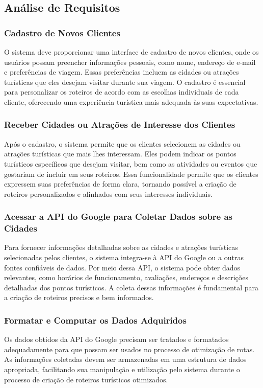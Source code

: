 \subsection{Análise de Requisitos}


\subsubsection{Cadastro de Novos Clientes}
O sistema deve proporcionar uma interface de cadastro de novos clientes, onde os usuários possam preencher informações pessoais, como nome, endereço de e-mail e preferências de viagem. Essas preferências incluem as cidades ou atrações turísticas que eles desejam visitar durante sua viagem. O cadastro é essencial para personalizar os roteiros de acordo com as escolhas individuais de cada cliente, oferecendo uma experiência turística mais adequada às suas expectativas.

\subsubsection{Receber Cidades ou Atrações de Interesse dos Clientes}
Após o cadastro, o sistema permite que os clientes selecionem as cidades ou atrações turísticas que mais lhes interessam. Eles podem indicar os pontos turísticos específicos que desejam visitar, bem como as atividades ou eventos que gostariam de incluir em seus roteiros. Essa funcionalidade permite que os clientes expressem suas preferências de forma clara, tornando possível a criação de roteiros personalizados e alinhados com seus interesses individuais.

\subsubsection{Acessar a API do Google para Coletar Dados sobre as Cidades}
Para fornecer informações detalhadas sobre as cidades e atrações turísticas selecionadas pelos clientes, o sistema integra-se à API do Google ou a outras fontes confiáveis de dados. Por meio dessa API, o sistema pode obter dados relevantes, como horários de funcionamento, avaliações, endereços e descrições detalhadas dos pontos turísticos. A coleta dessas informações é fundamental para a criação de roteiros precisos e bem informados.

\subsubsection{Formatar e Computar os Dados Adquiridos}
Os dados obtidos da API do Google precisam ser tratados e formatados adequadamente para que possam ser usados no processo de otimização de rotas. As informações coletadas devem ser armazenadas em uma estrutura de dados apropriada, facilitando sua manipulação e utilização pelo sistema durante o processo de criação de roteiros turísticos otimizados.

